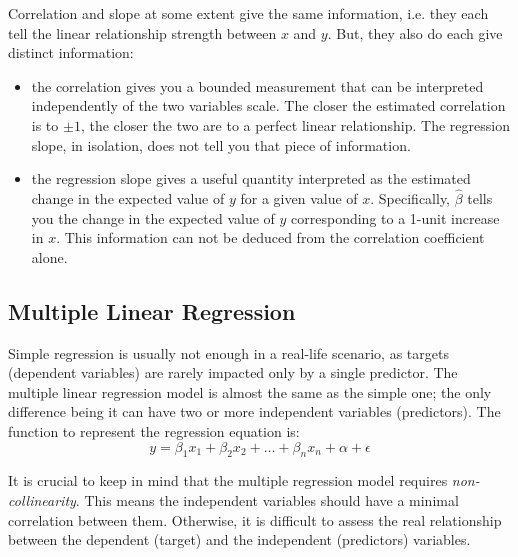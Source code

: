 Correlation and slope at some extent give the same information, i.e. they each tell the linear relationship strength between $x$ and $y$. But, they also do each give distinct information:
\begin{itemize}
\item the correlation gives you a bounded measurement that can be interpreted independently of the two variables scale. The closer the estimated correlation is to $\pm1$, the closer the two are to a perfect linear relationship. The regression slope, in isolation, does not tell you that piece of information.
\item the regression slope gives a useful quantity interpreted as the estimated change in the expected value of $y$ for a given value of $x$. Specifically, $\hat{\beta}$ tells you the change in the expected value of $y$ corresponding to a 1-unit increase in $x$. This information can not be deduced from the correlation coefficient alone.
\end{itemize}

%

\subsection{Multiple Linear Regression}
Simple regression is usually not enough in a real-life scenario, as targets (dependent variables) are rarely impacted only by a single predictor.
The multiple linear regression model is almost the same as the simple one; the only difference being it can have two or more independent variables (predictors).
The function to represent the regression equation is:
\begin{equation}
y = \beta_1 x_1 + \beta_2 x_2 + \ldots + \beta_n x_n + \alpha + \epsilon
\label{eq:multiple_regression}
\end{equation}

It is crucial to keep in mind that the multiple regression model requires \emph{non-collinearity}. This means the independent variables should have a minimal correlation between them. Otherwise, it is difficult to assess the real relationship between the dependent (target) and the independent (predictors) variables.

